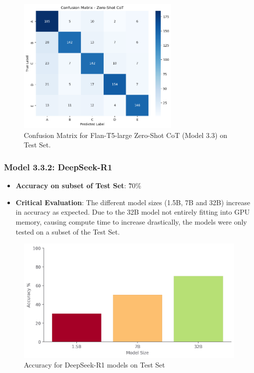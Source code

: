 \documentclass[10.5pt]{article}
\begin{document}
\begin{figure}[htbp]
    \centering
    \includegraphics[width=0.7\textwidth]{images/model3_3_confusion_matrix.png}
    \caption{Confusion Matrix for Flan-T5-large Zero-Shot CoT (Model 3.3) on Test Set.}
    \label{fig:conf_matrix_model3_3}
\end{figure}
\subsubsection{Model 3.3.2: DeepSeek-R1}
\begin{itemize}
    \item  \textbf{Accuracy on subset of Test Set}: \~70\%
    \item \textbf{Critical Evaluation}: The different model sizes (1.5B, 7B and 32B) increase in accuracy as expected. Due to the 32B model not entirely fitting into GPU memory, causing compute time to increase drastically, the models were only tested on a subset of the Test Set.
\end{itemize}
    \begin{figure}
        \centering
        \includegraphics[width=0.8\linewidth]{images/DeepSeek-R1 Zero-Shot CoT Prompting Results.png}
        \caption{Accuracy for DeepSeek-R1 models on Test Set}
        \label{fig:deepseek-r1_zero-shot_cot_promting_results}
    \end{figure}
\end{document}
